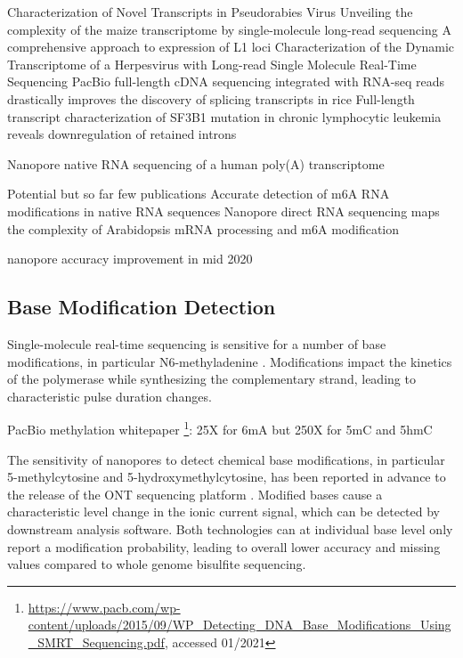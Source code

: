Characterization of Novel Transcripts in Pseudorabies Virus \cite{Tombacz2015}
Unveiling the complexity of the maize transcriptome by single-molecule long-read sequencing \cite{Wang2016}
A comprehensive approach to expression of L1 loci \cite{Deininger2017}
Characterization of the Dynamic Transcriptome of a Herpesvirus with Long-read Single Molecule Real-Time Sequencing \cite{Tombacz2017}
PacBio full-length cDNA sequencing integrated with RNA-seq reads drastically improves the discovery of splicing transcripts in rice \cite{Zhang2019a}
Full-length transcript characterization of SF3B1 mutation in chronic lymphocytic leukemia reveals downregulation of retained introns \cite{Tang2020}

Nanopore native RNA sequencing of a human poly(A) transcriptome \cite{Workman2019}

Potential but so far few publications
Accurate detection of m6A RNA modifications in native RNA sequences \cite{Liu2019}
Nanopore direct RNA sequencing maps the complexity of Arabidopsis mRNA processing and m6A modification \cite{Parker2020}

nanopore accuracy improvement in mid 2020




\subsection{Base Modification Detection}
\label{subsec:state_of_art:basemod}

Single-molecule real-time sequencing is sensitive for a number of base modifications, in particular N6-methyladenine \cite{Flusberg2010}.
Modifications impact the kinetics of the polymerase while synthesizing the complementary strand, leading to characteristic pulse duration changes.


PacBio methylation whitepaper \footnote{\url{https://www.pacb.com/wp-content/uploads/2015/09/WP_Detecting_DNA_Base_Modifications_Using_SMRT_Sequencing.pdf}, accessed 01/2021}:
25X for 6mA but 250X for 5mC and 5hmC


The sensitivity of nanopores to detect chemical base modifications, in particular 5-methylcytosine and 5-hydroxymethylcytosine, has been reported in advance to the release of the ONT sequencing platform \cite{Laszlo2013, Schreiber2013}.
Modified bases cause a characteristic level change in the ionic current signal, which can be detected by downstream analysis software.
Both technologies can at individual base level only report a modification probability, leading to overall lower accuracy and missing values compared to whole genome bisulfite sequencing.

